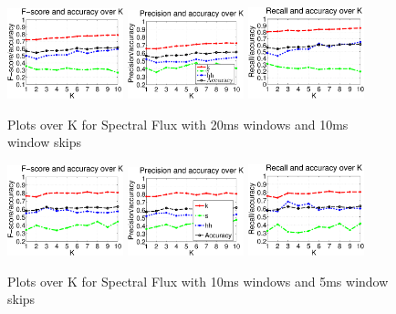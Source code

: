 
\begin{figure}


	\centering\includegraphics[width=0.3\textwidth]{sflux2010FP.png}
	\centering\includegraphics[width=0.3\textwidth]{sflux2010_P.png}
	\centering\includegraphics[width=0.3\textwidth]{sflux2010_R.png}
	
	\caption{Plots over K for Spectral Flux with 20ms windows and 10ms window skips}
\end{figure}
\begin{figure}


	\centering\includegraphics[width=0.3\textwidth]{sflux105FP.png}
	\centering\includegraphics[width=0.3\textwidth]{sflux105_P.png}
	\centering\includegraphics[width=0.3\textwidth]{sflux105_R.png}
		
		\caption{Plots over K for Spectral Flux with 10ms windows and 5ms window skips}
\end{figure}

